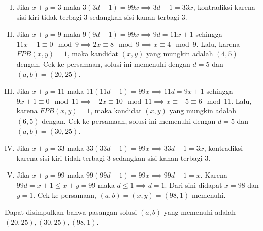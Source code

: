 \begin{enumerate}[(I)]
    \item Jika $x+y = 3$ maka $3(3d-1) = 99x \implies 3d-1 = 33x$, kontradiksi karena sisi kiri tidak terbagi 3 sedangkan sisi kanan terbagi 3.

    \item Jika $x+y= 9$ maka $9(9d-1) = 99x \implies 9d = 11x+1$ sehingga $11x+1 \equiv 0 \mod 9 \implies 2x \equiv 8 \mod 9 \implies x \equiv 4 \mod 9$. Lalu, karena $FPB(x,y) = 1$, maka kandidat $(x,y)$ yang mungkin adalah $(4,5)$ dengan. Cek ke persamaan, solusi ini memenuhi dengan $d = 5$ dan $(a,b)=(20,25)$.

    \item Jika $x+y= 11$ maka $11(11d-1) = 99x \implies 11d = 9x+1$ sehingga $9x+1 \equiv 0 \mod 11 \implies -2x \equiv 10 \mod 11 \implies x \equiv -5 \equiv 6 \mod 11$. Lalu, karena $FPB(x,y) = 1$, maka kandidat $(x,y)$ yang mungkin adalah $(6,5)$ dengan. Cek ke persamaan, solusi ini memenuhi dengan $d = 5$ dan $(a,b)=(30,25)$.

    \item Jika $x+y = 33$ maka $33(33d-1) = 99x \implies 33d-1 = 3x$, kontradiksi karena sisi kiri tidak terbagi 3 sedangkan sisi kanan terbagi 3.

    \item Jika $x+y= 99$ maka $99(99d-1) = 99x \implies 99d-1 = x$. Karena $99d = x+1 \le x+y = 99$ maka $d \le 1 \implies d=1$. Dari sini didapat $x=98$ dan $y=1$. Cek ke persamaan, $(a,b)=(x,y)=(98,1)$ memenuhi.
\end{enumerate}
Dapat disimpulkan bahwa pasangan solusi $(a,b)$ yang memenuhi adalah $(20,25),(30,25),(98,1)$.